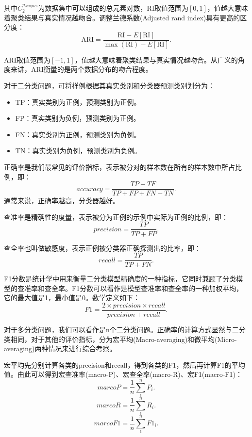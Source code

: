 \documentclass[UTF8]{ctexart}
\begin{document}
其中$C_{2}^{n_{samples}}$为数据集中可以组成的总元素对数，RI取值范围为$[0,1]$，值越大意味着聚类结果与真实情况越吻合。调整兰德系数(Adjusted rand index)具有更高的区分度：
\begin{equation}
\mathrm{ARI}=\frac{\mathrm{RI}-E[\mathrm{RI}]}{\max (\mathrm{RI})-E[\mathrm{RI}]}.
\end{equation}

ARI取值范围为$[-1,1]$，值越大意味着聚类结果与真实情况越吻合。从广义的角度来讲，ARI衡量的是两个数据分布的吻合程度。

对于二分类问题，可将样例根据其真实类别和分类器预测类别划分为：
\begin{itemize}
	\item TP：真实类别为正例，预测类别为正例。
	\item FP：真实类别为负例，预测类别为正例。
	\item FN：真实类别为正例，预测类别为负例。
	\item TN：真实类别为负例，预测类别为负例。
\end{itemize}

正确率是我们最常见的评价指标，表示被分对的样本数在所有的样本数中所占比例，即：
\begin{equation}
accuracy = \frac{TP+TF}{TP+FP+FN+TN}.
\end{equation}
通常来说，正确率越高，分类器越好。

查准率是精确性的度量，表示被分为正例的示例中实际为正例的比例，即：
\begin{equation}
	precision = \frac{TP}{TP+FP}.
\end{equation}

查全率也叫做敏感度，表示正例被分类器正确探测出的比率，即：
\begin{equation}
	recall = \frac{TP}{TP+FN}.
\end{equation}

F1分数是统计学中用来衡量二分类模型精确度的一种指标，它同时兼顾了分类模型的查准率和查全率。F1分数可以看作是模型查准率和查全率的一种加权平均，它的最大值是1，最小值是0。数学定义如下：
\begin{equation}
	F1 = \frac{2\times{precision}\times{recall}}{precision+recall}.
\end{equation}

对于多分类问题，我们可以看作是n个二分类问题。正确率的计算方式显然与二分类相同，对于其他的评价指标，分为宏平均(Macro-averaging)和微平均(Micro-averaging)两种情况来进行综合考察。

宏平均先分别计算各类的precision和recall，得到各类的F1，然后再计算F1的平均值。由此可以得到宏查准率(macro-P)、宏查全率(macro-R)、宏F1(macro-F1)：
\begin{equation}
	marcoP=\frac{1}{n}\sum_1^nP_i.
\end{equation}
\begin{equation}
	marcoR=\frac{1}{n}\sum_1^nR_i.
\end{equation}
\begin{equation}
	marcoF1=\frac{1}{n}\sum_1^nF1_i.
\end{equation}
\end{document}
